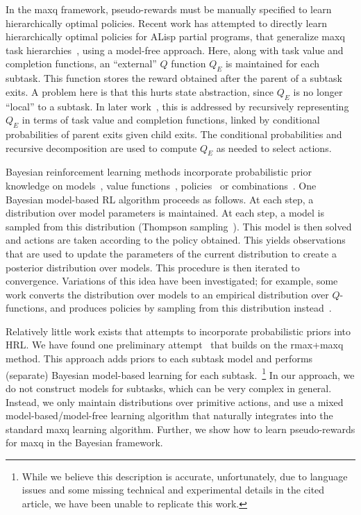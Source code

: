 In the {\sc maxq} framework, pseudo-rewards must be manually specified
to learn hierarchically optimal policies. Recent work has attempted to
directly learn hierarchically optimal policies for ALisp partial
programs, that generalize {\sc maxq} task
hierarchies~\cite{alisp,marthi.uai06}, using a model-free
approach. Here, along with task value and completion functions, an
``external'' $Q$ function $Q_E$ is maintained for each subtask. This
function stores the reward obtained after the parent of a subtask
exits. A problem here is that this hurts state abstraction, since
$Q_E$ is no longer ``local'' to a subtask. In later
work~\cite{marthi.uai06}, this is addressed by recursively
representing $Q_E$ in terms of task value and completion functions,
linked by conditional probabilities of parent exits given child
exits. The conditional probabilities and recursive decomposition are
used to compute $Q_E$ as needed to select actions.

Bayesian reinforcement learning methods incorporate probabilistic
prior knowledge on models~\cite{dearden.uai99}, value
functions~\cite{Dearden98,Engel03},
policies~\cite{Ghavamzadeh07bayesianpolicy} or
combinations~\cite{ghavamzadeh:icml07}. One Bayesian model-based RL
algorithm proceeds as follows. At each step, a distribution over model
parameters is maintained.  At each step, a model is sampled from this
distribution (Thompson sampling~\cite{Thompson, Strens}). This model
is then solved and actions are taken according to the policy
obtained. This yields observations that 
are used to update the parameters of the current distribution to
create a posterior distribution over models. This procedure is then
iterated to convergence.
Variations of this idea have been investigated; for
example, some work converts the distribution over models to an
empirical distribution over $Q$-functions, and produces policies by
sampling from this distribution instead~\cite{dearden.uai99}.


Relatively little work exists that attempts to incorporate
probabilistic priors into HRL. We have found one preliminary
attempt~\cite{Zhao-bhrl-2010} that builds on the {\sc
  rmax+maxq}~\cite{rmax-maxq} method.  This 
 approach adds priors to each subtask model and performs
(separate) Bayesian model-based learning for each
subtask.~\footnote{While we believe this description is accurate,
  unfortunately, due to language issues and some missing technical and
  experimental details in the cited article, we have been unable to
  replicate this work.} In our approach, we do not construct models
for subtasks, which can be very complex in general.  Instead, we only
maintain distributions over primitive actions, and use a mixed
model-based/model-free learning algorithm that naturally integrates
into the standard {\sc maxq} learning algorithm. Further, we show how
to learn pseudo-rewards for {\sc maxq} in the Bayesian framework.
